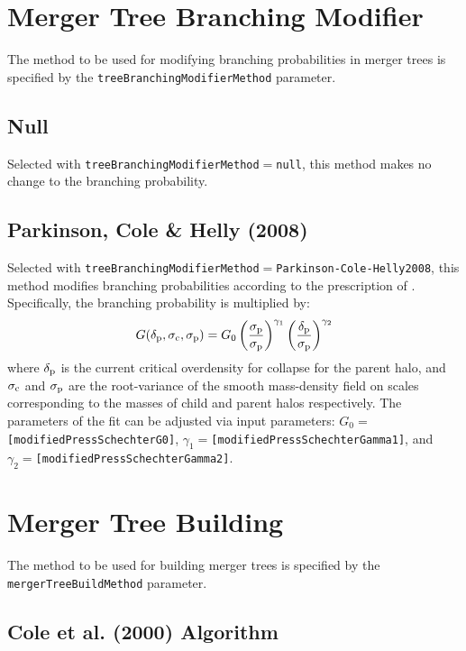 \section{Merger Tree Branching Modifier}

The method to be used for modifying branching probabilities in merger trees is specified by the {\tt treeBranchingModifierMethod} parameter.

\subsection{Null}

Selected with {\tt treeBranchingModifierMethod}$=${\tt null}, this method makes no change to the branching probability.

\subsection{Parkinson, Cole \& Helly (2008)}

Selected with {\tt treeBranchingModifierMethod}$=${\tt Parkinson-Cole-Helly2008}, this method modifies branching probabilities according to the prescription of \cite{parkinson_generating_2008}. Specifically, the branching probability is multiplied by:
\begin{equation}
 G(\delta_{\rm p},\sigma_{\rm c},\sigma_{\rm p}) = G_0 \left({\sigma_{\rm p}\over\sigma_{\rm p}}\right)^{\gamma_1} \left({\delta_{\rm p}\over\sigma_{\rm p}}\right)^{\gamma_2}
\end{equation}
where $\delta_{\rm p}$ is the current critical overdensity for collapse for the parent halo, and $\sigma_{\rm c}$ and $\sigma_{\rm p}$ are the root-variance of the smooth mass-density field on scales corresponding to the masses of child and parent halos respectively. The parameters of the fit can be adjusted via input parameters: $G_0=${\tt [modifiedPressSchechterG0]}, $\gamma_1=${\tt [modifiedPressSchechterGamma1]}, and $\gamma_2=${\tt [modifiedPressSchechterGamma2]}.

\section{Merger Tree Building}

The method to be used for building merger trees is specified by the {\tt mergerTreeBuildMethod} parameter.

\subsection{Cole et al. (2000) Algorithm}

